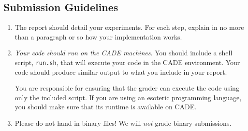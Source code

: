 \subsection*{Submission Guidelines}

\begin{enumerate}
\item The report should detail your experiments. For each step,
  explain in no more than a paragraph or so how your implementation
  works.

\item {\em Your code should run on the CADE machines}. You should
  include a shell script, {\tt run.sh}, that will execute your code
  in the CADE environment. Your code should produce similar output
  to what you include in your report.
  
  You are responsible for ensuring that the grader can execute the
  code using only the included script. If you are using an
  esoteric programming language, you should make sure that its
  runtime is available on CADE.


\item Please do not hand in binary files! We will {\em not} grade
  binary submissions.

\end{enumerate}

